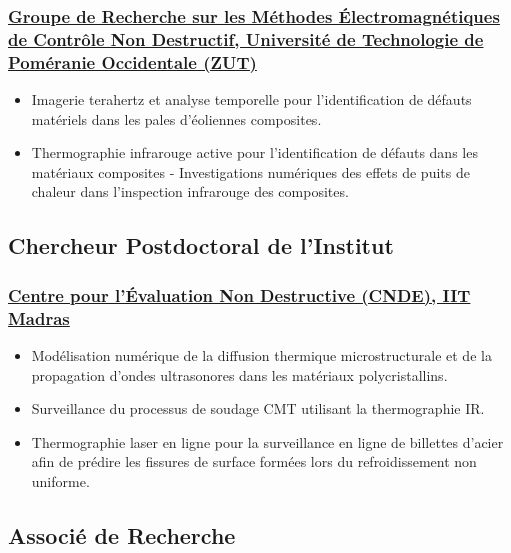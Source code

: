 \documentclass{my_cv}%
\begin{document}
\subsubsection{\href{https://innowacje.zut.edu.pl/cooperationoffer/electromagnetic-methods-non-destructive-testing}{Groupe de Recherche sur les Méthodes Électromagnétiques de Contrôle Non Destructif, Université de Technologie de Poméranie Occidentale (ZUT)}}
\begin{itemize}[leftmargin=0.15in]
\setlength\itemsep{-0.1em}
\color{mygray}
\item Imagerie terahertz et analyse temporelle pour l'identification de défauts matériels dans les pales d'éoliennes composites.
\item Thermographie infrarouge active pour l'identification de défauts dans les matériaux composites - Investigations numériques des effets de puits de chaleur dans l'inspection infrarouge des composites.
\end{itemize}
{\color{mygray1} \hdashrule[0.1ex]{18.8cm}{0.2mm}{1mm}}
\subsection{Chercheur Postdoctoral de l'Institut}
\subsubsection{\href{https://www.cnde.in/}{Centre pour l'Évaluation Non Destructive (CNDE), IIT Madras}}
\begin{itemize}[leftmargin=0.15in]
\setlength\itemsep{-0.1em}
\color{mygray}
\item Modélisation numérique de la diffusion thermique microstructurale et de la propagation d'ondes ultrasonores dans les matériaux polycristallins.
\item Surveillance du processus de soudage CMT utilisant la thermographie IR.
\item Thermographie laser en ligne pour la surveillance en ligne de billettes d'acier afin de prédire les fissures de surface formées lors du refroidissement non uniforme.
\end{itemize}
{\color{mygray1} \hdashrule[0.1ex]{18.8cm}{0.2mm}{1mm}}
\subsection{Associé de Recherche}
\end{document}
